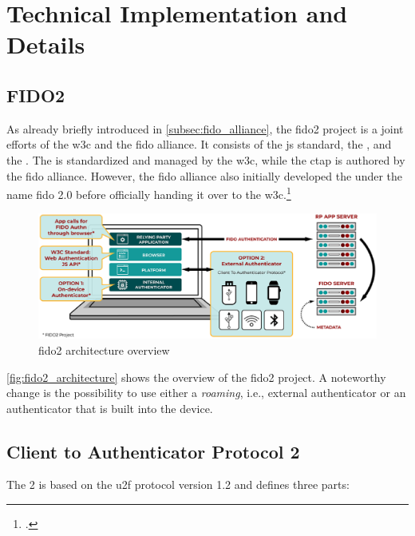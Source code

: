 \section{Technical Implementation and Details}

\subsection{FIDO2}

As already briefly introduced in \autoref{subsec:fido_alliance}, the \gls{fido}2 project is a joint efforts of the \gls{w3c} and the \gls{fido} alliance. It consists of the \gls{js} standard, the \wa{}, and the . The \wa{} is standardized and managed by the \gls{w3c}, while the \gls{ctap} is authored by the \gls{fido} alliance. However, the \gls{fido} alliance also initially developed the \wa{} under the name \gls{fido} 2.0 before officially handing it over to the \gls{w3c}.\footcites[See][254]{Schwartz2018}[See][3]{FormalVerificationWebAuthn}

\begin{figure}[hbt]
	\centering
	\includegraphics[width=\textwidth]{pics/FIDO2-Graphic-v2.eps}
	\caption[\gls{fido}2 architecture overview]{\gls{fido}2 architecture overview\footnotemark}
	\label{fig:fido2_architecture}
\end{figure}

\autoref{fig:fido2_architecture} shows the overview of the \gls{fido}2 project. A noteworthy change is the possibility to use either a \textit{roaming}, i.e., external authenticator or an authenticator that is built into the device.

\subsection{Client to Authenticator Protocol 2}

The  2 is based on the \gls{u2f} protocol version 1.2 and defines three parts:

